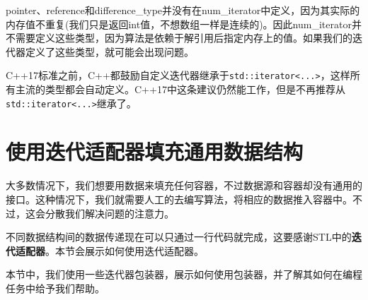 pointer、reference和difference\_type并没有在num\_iterator中定义，因为其实际的内存值不重复(我们只是返回int值，不想数组一样是连续的)。因此num\_iterator并不需要定义这些类型，因为算法是依赖于解引用后指定内存上的值。如果我们的迭代器定义了这些类型，就可能会出现问题。


C++17标准之前，C++都鼓励自定义迭代器继承于\texttt{std::iterator<...>}，这样所有主流的类型都会自动定义。C++17中这条建议仍然能工作，但是不再推荐从\texttt{std::iterator<...>}继承了。


\section{使用迭代适配器填充通用数据结构}

大多数情况下，我们想要用数据来填充任何容器，不过数据源和容器却没有通用的接口。这种情况下，我们就需要人工的去编写算法，将相应的数据推入容器中。不过，这会分散我们解决问题的注意力。

不同数据结构间的数据传递现在可以只通过一行代码就完成，这要感谢STL中的\textbf{迭代适配器}。本节会展示如何使用迭代适配器。


本节中，我们使用一些迭代器包装器，展示如何使用包装器，并了解其如何在编程任务中给予我们帮助。


